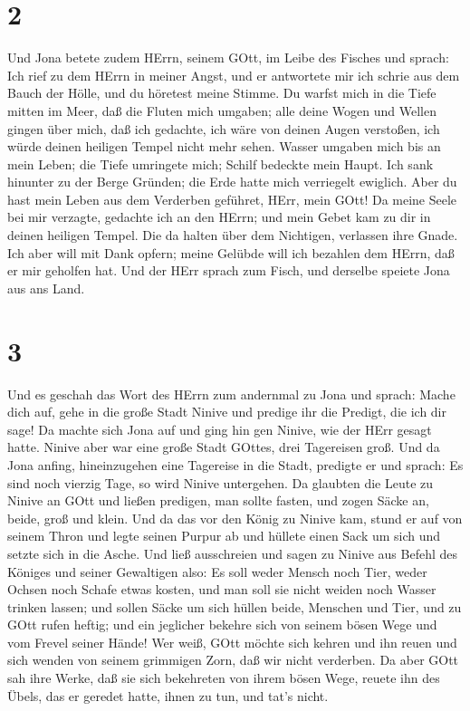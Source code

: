 \hypertarget{section}{%
\section{2}\label{section}}

 Und Jona betete zudem HErrn, seinem GOtt, im Leibe des
Fisches  und sprach: Ich rief zu dem HErrn in meiner Angst,
und er antwortete mir ich schrie aus dem Bauch der Hölle, und du
höretest meine Stimme.  Du warfst mich in die Tiefe mitten
im Meer, daß die Fluten mich umgaben; alle deine Wogen und Wellen gingen
über mich,  daß ich gedachte, ich wäre von deinen Augen
verstoßen, ich würde deinen heiligen Tempel nicht mehr sehen.
 Wasser umgaben mich bis an mein Leben; die Tiefe umringete
mich; Schilf bedeckte mein Haupt.  Ich sank hinunter zu der
Berge Gründen; die Erde hatte mich verriegelt ewiglich. Aber du hast
mein Leben aus dem Verderben geführet, HErr, mein GOtt!  Da
meine Seele bei mir verzagte, gedachte ich an den HErrn; und mein Gebet
kam zu dir in deinen heiligen Tempel.  Die da halten über
dem Nichtigen, verlassen ihre Gnade.  Ich aber will mit Dank
opfern; meine Gelübde will ich bezahlen dem HErrn, daß er mir geholfen
hat.  Und der HErr sprach zum Fisch, und derselbe speiete
Jona aus ans Land.

\hypertarget{section-1}{%
\section{3}\label{section-1}}

 Und es geschah das Wort des HErrn zum andernmal zu Jona und
sprach:  Mache dich auf, gehe in die große Stadt Ninive und
predige ihr die Predigt, die ich dir sage!  Da machte sich
Jona auf und ging hin gen Ninive, wie der HErr gesagt hatte. Ninive aber
war eine große Stadt GOttes, drei Tagereisen groß.  Und da
Jona anfing, hineinzugehen eine Tagereise in die Stadt, predigte er und
sprach: Es sind noch vierzig Tage, so wird Ninive untergehen.
 Da glaubten die Leute zu Ninive an GOtt und ließen
predigen, man sollte fasten, und zogen Säcke an, beide, groß und klein.
 Und da das vor den König zu Ninive kam, stund er auf von
seinem Thron und legte seinen Purpur ab und hüllete einen Sack um sich
und setzte sich in die Asche.  Und ließ ausschreien und
sagen zu Ninive aus Befehl des Königes und seiner Gewaltigen also: Es
soll weder Mensch noch Tier, weder Ochsen noch Schafe etwas kosten, und
man soll sie nicht weiden noch Wasser trinken lassen;  und
sollen Säcke um sich hüllen beide, Menschen und Tier, und zu GOtt rufen
heftig; und ein jeglicher bekehre sich von seinem bösen Wege und vom
Frevel seiner Hände!  Wer weiß, GOtt möchte sich kehren und
ihn reuen und sich wenden von seinem grimmigen Zorn, daß wir nicht
verderben.  Da aber GOtt sah ihre Werke, daß sie sich
bekehreten von ihrem bösen Wege, reuete ihn des Übels, das er geredet
hatte, ihnen zu tun, und tat's nicht.

